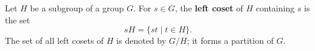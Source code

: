 Let $H$ be a subgroup of a group $G$. For $s \in G$, the \textbf{left coset} of $H$ containing $s$ is the set
$$sH = \{ st \mid t \in H \}.$$
The set of all left cosets of $H$ is denoted by $G/H$; it forms a partition of $G$.
